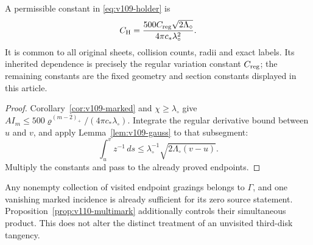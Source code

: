 \begin{corollary}
\label{cor:v110-holder-constant}
A permissible constant in \eqref{eq:v109-holder} is
\begin{equation}\label{eq:v110-holder-constant}
 C_{\rm H}=
 \frac{500C_{\rm reg}\sqrt{2\Lambda_\circ}}
                 {4\pi c_*\lambda_\circ^2}.
\end{equation}
It is common to all original sheets, collision counts, radii and
exact labels. Its inherited dependence is precisely the regular
variation constant $C_{\rm reg}$; the remaining constants are the
fixed geometry and section constants displayed in this article.
\end{corollary}
\begin{proof}
Corollary~\ref{cor:v109-marked} and $\chi\ge\lambda_\circ$ give
$AI_m\le500\varrho^{(m-2)_+}/(4\pi c_*\lambda_\circ)$.
Integrate the regular derivative bound between $u$ and $v$, and
apply Lemma~\ref{lem:v109-gauss} to that subsegment:
\[
 \int_u^v z^{-1}\,ds
          \le\lambda_\circ^{-1}\sqrt{2\Lambda_\circ(v-u)}.
\]
Multiply the constants and pass to the already proved endpoints.
\end{proof}
Any nonempty collection of visited endpoint grazings belongs to
$\Gamma$, and one vanishing marked incidence is already sufficient
for its zero source statement. Proposition~\ref{prop:v110-multimark}
additionally controls their simultaneous product. This does not
alter the distinct treatment of an unvisited third-disk tangency.
